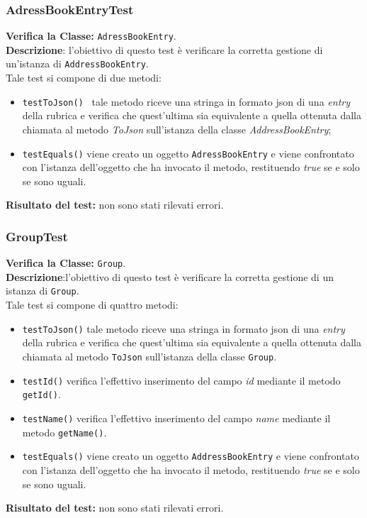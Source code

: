 \subsubsection{AdressBookEntryTest}
\textbf{Verifica la Classe:} \texttt{AdressBookEntry}.\\
\textbf{Descrizione}: l'obiettivo di questo test è verificare la corretta gestione di un'istanza di \texttt{AddressBookEntry}.\\
Tale test si compone di due metodi:
\begin{itemize}
\item \texttt{testToJson() } tale metodo riceve una stringa in formato json di una 	\textit{entry} della rubrica e verifica che quest'ultima sia equivalente a quella ottenuta dalla chiamata al metodo \textit{ToJson} sull'istanza della classe \textit{AddressBookEntry};
\item\texttt{testEquals()} viene creato un oggetto \texttt{AdressBookEntry} e viene confrontato con l'istanza dell'oggetto che ha invocato il metodo, restituendo \textit{true} se e solo se sono uguali.
\end{itemize}
\textbf{Risultato del test:} non sono stati rilevati errori.

\subsubsection{GroupTest}
\textbf{Verifica la Classe:} \texttt{Group}.\\
\textbf{Descrizione}:l'obiettivo di questo test è verificare la corretta gestione di un istanza di \texttt{Group}.\\
Tale test si compone di quattro metodi:
\begin{itemize}
\item \texttt{testToJson()} tale metodo riceve una stringa in formato json di una \textit{entry} della rubrica e verifica che quest'ultima sia equivalente a quella ottenuta dalla chiamata al metodo \texttt{ToJson} sull'istanza della classe \texttt{Group}.
\item \texttt{testId()} verifica l'effettivo inserimento del campo \textit{id} mediante il metodo \texttt{getId()}.
\item \texttt{testName()} verifica l'effettivo inserimento del campo \textit{name} mediante il metodo \texttt{getName()}.
\item \texttt{testEquals()} viene creato un oggetto \texttt{AddressBookEntry} e viene confrontato con l'istanza dell'oggetto che ha invocato il metodo, restituendo \textit{true} se e solo se sono uguali.
\end{itemize}
\textbf{Risultato del test:} non sono stati rilevati errori.

